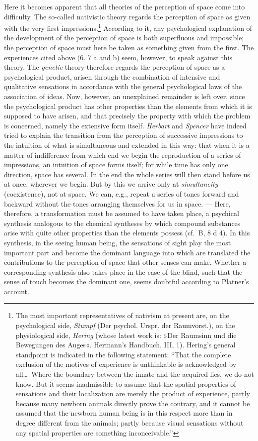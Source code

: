 \documentclass[12pt,a4paper]{book}
\newcommand{\opage}[1]{\marginnote{\footnotesize\textit{[#1]}}}
\begin{document}
Here it becomes apparent that all theories of the perception of space
come into difficulty. The so-called nativistic theory regards the
perception of space as given with the very first
impressions.\footnote{The most important representatives of nativism at
present are, on the psychological side, \emph{Stumpf} (Der psychol.
Urspr. der Raumvorst.), on the physiological side, \emph{Hering} (whose
latest work is: »Der Raumsinn und die Bewegungen des Auges«. Hermann's
Handbuch. III, 1). Hering's general standpoint is indicated in the
following statement: ``That the complete exclusion of the motives of
experience is unthinkable is acknowledged by all\ldots\ Where the boundary
between the innate and the acquired lies, we do not know. But it seems
inadmissible to assume that the spatial properties of sensations and
their localization are merely the product of experience, partly because
many newborn animals directly prove the contrary, and it cannot be
assumed that the newborn human being is in this respect more than in
degree different from the animals; partly because visual sensations
without any spatial properties are something inconceivable.''} According
to it, any psychological explanation of the development of the
perception of space is both superfluous and impossible; the perception of
space must here be taken as something given from the first. The
experiences cited above (6. 7 a and b) seem, however, to speak against
this theory. The \emph{genetic} theory therefore regards the perception
of space as a psychological product, arisen through the combination of
intensive and qualitative sensations in accordance with the general
psychological laws of the association of ideas. Now, however, an
unexplained remainder is left over, since the psychological
\opage{247}product has other properties than the elements from which it
is supposed to have arisen, and that precisely the property with which
the problem is concerned, namely the extensive form itself.
\emph{Herbart} and \emph{Spencer} have indeed tried to explain the
transition from the perception of successive impressions to the
intuition of what is simultaneous and extended in this way: that when it
is a matter of indifference from which end we begin the reproduction of
a series of impressions, an intuition of space forms itself; for while
time has only one direction, space has several. In the end the whole
series will then stand before us at once, wherever we begin. But by this
we arrive only at \emph{simultaneity} (coexistence), not at space. We
can, e.g., repeat a series of tones forward and backward without the
tones arranging themselves for us in space. --- Here, therefore, a
transformation must be assumed to have taken place, a psychical
synthesis analogous to the chemical syntheses by which compound
substances arise with quite other properties than the elements possess
(cf.\ B, 8 d 4). In this synthesis, in the seeing human being, the
sensations of sight play the most important part and become the dominant
language into which are translated the contributions to the perception
of space that other senses can make. Whether a corresponding synthesis
also takes place in the case of the blind, such that the sense of touch
becomes the dominant one, seems doubtful according to Platner's account.
\end{document}
